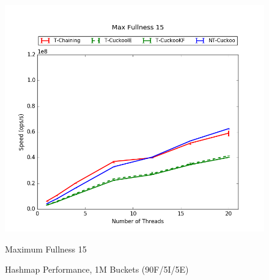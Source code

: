 \begin{figure}[H]
\begin{minipage}{0.45\textwidth}
    \end{minipage}
	\begin{minipage}{0.45\textwidth}\includegraphics[width=\textwidth]{maps/15HM1M:F90,I5,E5.png} 
        \caption*{Maximum Fullness 15}
    \end{minipage}
	\caption{Hashmap Performance, 1M Buckets (90F/5I/5E)}
\end{figure}
